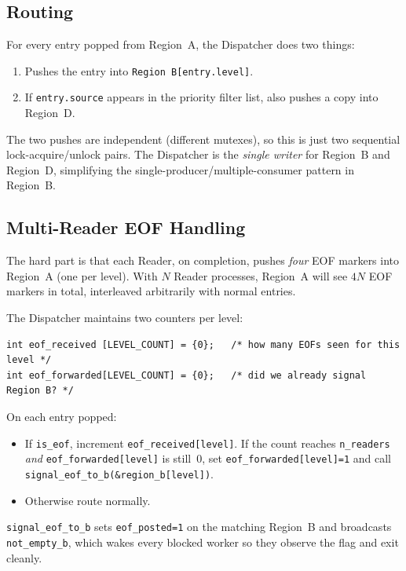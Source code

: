 \documentclass[11pt,a4paper]{article}
\newcommand{\code}[1]{\texttt{\small #1}}
\begin{document}
\subsection{Routing}

For every entry popped from Region~A, the Dispatcher does two things:

\begin{enumerate}
    \item Pushes the entry into \code{Region B[entry.level]}.
    \item If \code{entry.source} appears in the priority filter list,
        also pushes a copy into Region~D.
\end{enumerate}

The two pushes are independent (different mutexes), so this is just two
sequential lock-acquire/unlock pairs. The Dispatcher is the
\emph{single writer} for Region~B and Region~D, simplifying the
single-producer/multiple-consumer pattern in Region~B.

\subsection{Multi-Reader EOF Handling}

The hard part is that each Reader, on completion, pushes \emph{four}
EOF markers into Region~A (one per level). With $N$ Reader processes,
Region~A will see $4N$ EOF markers in total, interleaved arbitrarily
with normal entries.

\noindent
The Dispatcher maintains two counters per level:

\begin{lstlisting}[style=Cstyle]
int eof_received [LEVEL_COUNT] = {0};   /* how many EOFs seen for this level */
int eof_forwarded[LEVEL_COUNT] = {0};   /* did we already signal Region B? */
\end{lstlisting}

\noindent
On each entry popped:

\begin{itemize}
    \item If \code{is\_eof}, increment \code{eof\_received[level]}.
        If the count reaches \code{n\_readers} \emph{and}
        \code{eof\_forwarded[level]} is still~0, set
        \code{eof\_forwarded[level]=1} and call
        \code{signal\_eof\_to\_b(\&region\_b[level])}.
    \item Otherwise route normally.
\end{itemize}

\noindent
\code{signal\_eof\_to\_b} sets \code{eof\_posted=1} on the matching
Region~B and broadcasts \code{not\_empty\_b}, which wakes every blocked
worker so they observe the flag and exit cleanly.
\end{document}

